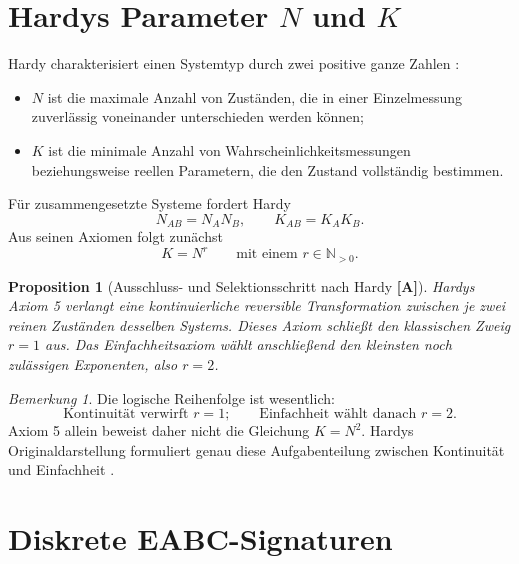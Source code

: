 \documentclass[11pt,a4paper,reqno]{amsart}
\newtheorem{proposition}[theorem]{Proposition}
\theoremstyle{definition}
\theoremstyle{remark}
\newtheorem{remark}[theorem]{Bemerkung}
\newcommand{\N}{\mathbb{N}}
\newcommand{\StatusA}{\textnormal{\textbf{[A]}}}
\begin{document}
\section{Hardys Parameter \texorpdfstring{$N$ und $K$}{N und K}}

Hardy charakterisiert einen Systemtyp durch zwei positive ganze Zahlen \cite{Hardy2001}:
\begin{itemize}[leftmargin=2.2em]
  \item $N$ ist die maximale Anzahl von Zuständen, die in einer Einzelmessung zuverlässig voneinander unterschieden werden können;
  \item $K$ ist die minimale Anzahl von Wahrscheinlichkeitsmessungen beziehungsweise reellen Parametern, die den Zustand vollständig bestimmen.
\end{itemize}

Für zusammengesetzte Systeme fordert Hardy
\begin{equation}
N_{AB}=N_A N_B,
\qquad
K_{AB}=K_A K_B.
\end{equation}
Aus seinen Axiomen folgt zunächst
\begin{equation}
K=N^r
\qquad\text{mit einem }r\in\N_{>0}.
\end{equation}

\begin{proposition}[Ausschluss- und Selektionsschritt nach Hardy \StatusA]
\label{prop:hardy-selection}
Hardys Axiom 5 verlangt eine kontinuierliche reversible Transformation zwischen je zwei reinen Zuständen desselben Systems. Dieses Axiom schließt den klassischen Zweig $r=1$ aus. Das Einfachheitsaxiom wählt anschließend den kleinsten noch zulässigen Exponenten, also $r=2$.
\end{proposition}

\begin{remark}
Die logische Reihenfolge ist wesentlich:
\begin{equation}
\boxed{
\text{Kontinuität verwirft }r=1;
\qquad
\text{Einfachheit wählt danach }r=2.
}
\end{equation}
Axiom 5 allein beweist daher nicht die Gleichung $K=N^2$. Hardys Originaldarstellung formuliert genau diese Aufgabenteilung zwischen Kontinuität und Einfachheit \cite{Hardy2001}.
\end{remark}

\section{Diskrete EABC-Signaturen}
\end{document}
